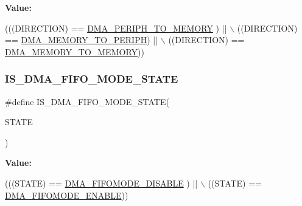 {\bfseries Value\+:}
\begin{DoxyCode}
(((DIRECTION) == \hyperlink{group___d_m_a___data__transfer__direction_gacb2cbf03ecae6804ae4a6f60a3e37c12}{DMA\_PERIPH\_TO\_MEMORY} ) || \(\backslash\)
                                     ((DIRECTION) == \hyperlink{group___d_m_a___data__transfer__direction_ga9e76fc559a2d5c766c969e6e921b1ee9}{DMA\_MEMORY\_TO\_PERIPH})  || \(\backslash\)
                                     ((DIRECTION) == \hyperlink{group___d_m_a___data__transfer__direction_ga0695035d725855ccf64d2d8452a33810}{DMA\_MEMORY\_TO\_MEMORY}))
\end{DoxyCode}
\mbox{\label{group___d_m_a___private___macros_gadb90a893aeb49fd4bc14af750af3837c}} 
\subsubsection{\texorpdfstring{I\+S\+\_\+\+D\+M\+A\+\_\+\+F\+I\+F\+O\+\_\+\+M\+O\+D\+E\+\_\+\+S\+T\+A\+TE}{IS\_DMA\_FIFO\_MODE\_STATE}}
{\footnotesize\ttfamily \#define I\+S\+\_\+\+D\+M\+A\+\_\+\+F\+I\+F\+O\+\_\+\+M\+O\+D\+E\+\_\+\+S\+T\+A\+TE(\begin{DoxyParamCaption}\item[{}]{S\+T\+A\+TE }\end{DoxyParamCaption})}

{\bfseries Value\+:}
\begin{DoxyCode}
(((STATE) == \hyperlink{group___d_m_a___f_i_f_o__direct__mode_gaec22b199f9da9214bf908d7edbcd83e8}{DMA\_FIFOMODE\_DISABLE} ) || \(\backslash\)
                                       ((STATE) == \hyperlink{group___d_m_a___f_i_f_o__direct__mode_ga18709570bed6b9112520701c482fbe4b}{DMA\_FIFOMODE\_ENABLE}))
\end{DoxyCode}
\mbox{\label{group___d_m_a___private___macros_gaeafc0d9e327d6e5b26cd37f6744b232f}} 
